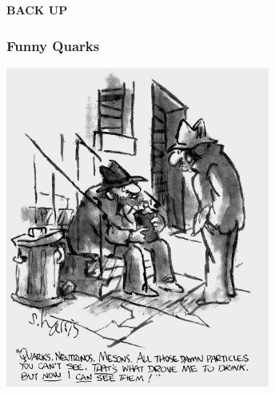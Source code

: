 \documentclass{beamer}
\begin{document}
{
\begin{frame}
  \begin{center}
   \textcolor{UMN@Maroon}{\Huge{\textbf{BACK UP}} }
  \end{center}
\end{frame}
}

\begin{frame}
\frametitle{Funny Quarks}
 \includegraphics[height=0.65\textwidth,width=0.65\textwidth]{THESISPLOTS/New-Physics-PLOTS/FunnyQuarks.jpg}
\end{frame}
\end{document}
